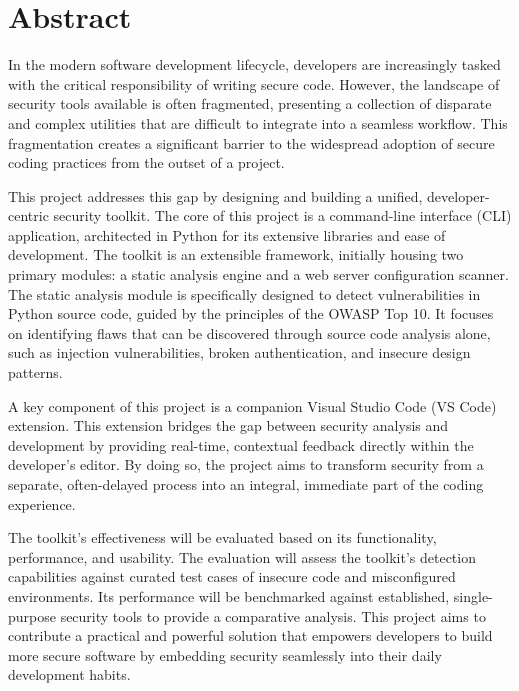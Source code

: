 %
%
\chapter{Abstract}
\begin{SingleSpace}
In the modern software development lifecycle, developers are increasingly tasked with the critical responsibility of writing secure code. However, the landscape of security tools available is often fragmented, presenting a collection of disparate and complex utilities that are difficult to integrate into a seamless workflow. This fragmentation creates a significant barrier to the widespread adoption of secure coding practices from the outset of a project.

This project addresses this gap by designing and building a unified, developer-centric security toolkit. The core of this project is a command-line interface (CLI) application, architected in Python for its extensive libraries and ease of development. The toolkit is an extensible framework, initially housing two primary modules: a static analysis engine and a web server configuration scanner. The static analysis module is specifically designed to detect vulnerabilities in Python source code, guided by the principles of the OWASP Top 10. It focuses on identifying flaws that can be discovered through source code analysis alone, such as injection vulnerabilities, broken authentication, and insecure design patterns.

A key component of this project is a companion Visual Studio Code (VS Code) extension. This extension bridges the gap between security analysis and development by providing real-time, contextual feedback directly within the developer's editor. By doing so, the project aims to transform security from a separate, often-delayed process into an integral, immediate part of the coding experience.

The toolkit's effectiveness will be evaluated based on its functionality, performance, and usability. The evaluation will assess the toolkit's detection capabilities against curated test cases of insecure code and misconfigured environments. Its performance will be benchmarked against established, single-purpose security tools to provide a comparative analysis. This project aims to contribute a practical and powerful solution that empowers developers to build more secure software by embedding security seamlessly into their daily development habits.
\end{SingleSpace}
